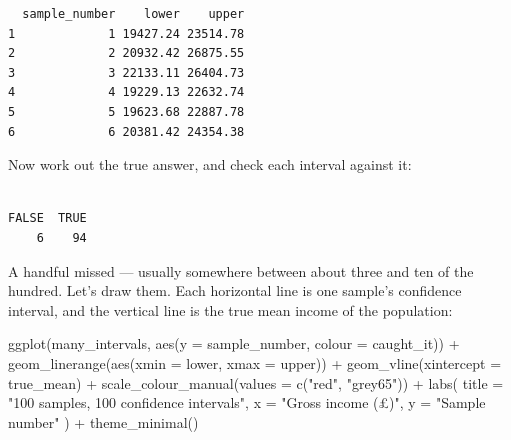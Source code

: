 \documentclass[
  letterpaper,
  DIV=11,
  numbers=noendperiod]{scrreprt}
\newenvironment{Shaded}{\begin{snugshade}}{\end{snugshade}}
\newcommand{\AttributeTok}[1]{\textcolor[rgb]{0.40,0.45,0.13}{#1}}
\newcommand{\CommentTok}[1]{\textcolor[rgb]{0.37,0.37,0.37}{#1}}
\newcommand{\FunctionTok}[1]{\textcolor[rgb]{0.28,0.35,0.67}{#1}}
\newcommand{\NormalTok}[1]{\textcolor[rgb]{0.00,0.23,0.31}{#1}}
\newcommand{\OtherTok}[1]{\textcolor[rgb]{0.00,0.23,0.31}{#1}}
\newcommand{\SpecialCharTok}[1]{\textcolor[rgb]{0.37,0.37,0.37}{#1}}
\newcommand{\StringTok}[1]{\textcolor[rgb]{0.13,0.47,0.30}{#1}}
\begin{document}
\begin{verbatim}
  sample_number    lower    upper
1             1 19427.24 23514.78
2             2 20932.42 26875.55
3             3 22133.11 26404.73
4             4 19229.13 22632.74
5             5 19623.68 22887.78
6             6 20381.42 24354.38
\end{verbatim}

Now work out the true answer, and check each interval against it:

\begin{Shaded}
\end{Shaded}

\begin{verbatim}

FALSE  TRUE 
    6    94 
\end{verbatim}

A handful missed --- usually somewhere between about three and ten of
the hundred. Let's draw them. Each horizontal line is one sample's
confidence interval, and the vertical line is the true mean income of
the population:

\begin{Shaded}
\begin{Highlighting}[]
\FunctionTok{ggplot}\NormalTok{(many\_intervals, }\FunctionTok{aes}\NormalTok{(}\AttributeTok{y =}\NormalTok{ sample\_number, }\AttributeTok{colour =}\NormalTok{ caught\_it)) }\SpecialCharTok{+}
  \FunctionTok{geom\_linerange}\NormalTok{(}\FunctionTok{aes}\NormalTok{(}\AttributeTok{xmin =}\NormalTok{ lower, }\AttributeTok{xmax =}\NormalTok{ upper)) }\SpecialCharTok{+}
  \FunctionTok{geom\_vline}\NormalTok{(}\AttributeTok{xintercept =}\NormalTok{ true\_mean) }\SpecialCharTok{+}
  \FunctionTok{scale\_colour\_manual}\NormalTok{(}\AttributeTok{values =} \FunctionTok{c}\NormalTok{(}\StringTok{"red"}\NormalTok{, }\StringTok{"grey65"}\NormalTok{)) }\SpecialCharTok{+}
  \FunctionTok{labs}\NormalTok{(}
    \AttributeTok{title =} \StringTok{"100 samples, 100 confidence intervals"}\NormalTok{,}
    \AttributeTok{x =} \StringTok{"Gross income (£)"}\NormalTok{,}
    \AttributeTok{y =} \StringTok{"Sample number"}
\NormalTok{  ) }\SpecialCharTok{+}
  \FunctionTok{theme\_minimal}\NormalTok{()}
\end{Highlighting}
\end{Shaded}
\end{document}

